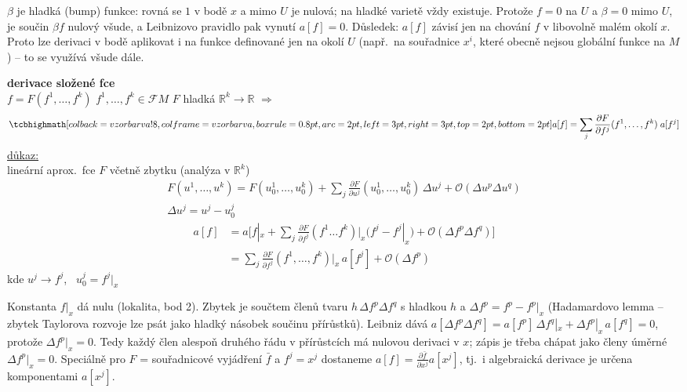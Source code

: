 \begin{vysvetleni}
$\beta$ je hladká  (bump) funkce: rovná se $1$ v bodě $x$ a mimo $U$ je nulová; na hladké varietě vždy existuje. Protože $f=0$ na $U$ a $\beta=0$ mimo $U$, je součin $\beta f$ nulový všude, a Leibnizovo pravidlo pak vynutí $a[f]=0$. Důsledek: $a[f]$ závisí jen na chování $f$ v libovolně malém okolí $x$. Proto lze derivaci v bodě aplikovat i na funkce definované jen na okolí $U$ (např.\ na souřadnice $x^i$, které obecně nejsou globální funkce na $M$) -- to se využívá všude dále.
\end{vysvetleni}

\textbf{derivace složené fce} \\
\quad $f = F(f^1,\dots,f^k)$ \qquad $f^1,\dots,f^k\in\mathcal{F}M$ \qquad $F$ hladká $\mathbb{R}^k\to\mathbb{R}$ \quad $\Rightarrow$
\[
  \vzorec{a[f] = \sum_j\frac{\partial F}{\partial f^j}(f^1,\dots,f^k)\;a[f^j]}
\]
\underline{důkaz:} \\
\quad lineární aprox.\ fce $F$ včetně zbytku (analýza v $\mathbb{R}^k$)
\begin{gather*}
  F(u^1,\dots,u^k) = F(u_0^1,\dots,u_0^k) + \sum_j\frac{\partial F}{\partial u^j}(u_0^1,\dots,u_0^k)\,\Delta u^j + \mathcal{O}(\Delta u^p\Delta u^q) \\
  \Delta u^j = u^j - u_0^j
\end{gather*}
\begin{align*}
  a[f] &= a\Big[f|_x + \sum_j\frac{\partial F}{\partial f^j}(f^1\dots f^k)\Big|_x\big(f^j - f^j|_{x}\big) + \mathcal{O}(\Delta f^p\Delta f^q)\Big] \\
  &= \sum_j\frac{\partial F}{\partial f^j}(f^1,\dots,f^k)\Big|_x\,a[f^j] + \mathcal{O}(\Delta f^p)
\end{align*}
\quad kde $u^j\to f^j$, \ $u_0^j = f^j|_x$

\begin{vysvetleni}
Konstanta $f|_x$ dá nulu (lokalita, bod 2). Zbytek je součtem členů tvaru $h\,\Delta f^p\Delta f^q$ s hladkou $h$ a $\Delta f^p=f^p-f^p|_x$ (Hadamardovo lemma -- zbytek Taylorova rozvoje lze psát jako hladký násobek součinu přírůstků). Leibniz dává $a[\Delta f^p\Delta f^q]=a[f^p]\,\Delta f^q|_x+\Delta f^p|_x\,a[f^q]=0$, protože $\Delta f^p|_x=0$. Tedy každý člen alespoň druhého řádu v přírůstcích má nulovou derivaci v $x$; zápis  je třeba chápat jako členy úměrné $\Delta f^p|_x=0$. Speciálně pro $F$ = souřadnicové vyjádření $\bar f$ a $f^j=x^j$ dostaneme $a[f]=\frac{\partial\bar f}{\partial x^j}a[x^j]$, tj.\ i algebraická derivace je určena komponentami $a[x^j]$.
\end{vysvetleni}

